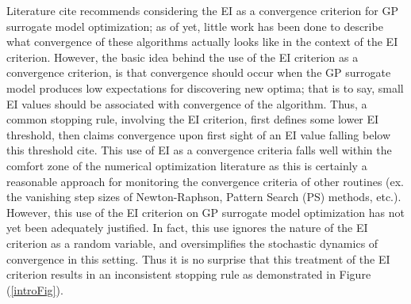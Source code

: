 \documentclass[12pt]{article}
\begin{document}
{\color{red}Literature cite} recommends considering the EI as a convergence criterion for GP surrogate model optimization; as of yet, little work has been done to describe what convergence of these algorithms actually looks like in the context of the EI criterion.
However, the basic idea behind the use of the EI criterion as a convergence criterion, is that convergence should occur when the GP surrogate model produces low expectations for discovering new optima; that is to say, small EI values should be associated with convergence of the algorithm.
Thus, a common stopping rule, involving the EI criterion, first defines some lower EI threshold, then claims convergence upon first sight of an EI value falling below this threshold {\color{red}cite}.    
This use of EI as a convergence criteria falls well within the comfort zone of the numerical optimization literature as this is certainly a reasonable approach for monitoring the convergence criteria of other routines (ex. the vanishing step sizes of Newton-Raphson, Pattern Search (PS) methods, etc.).
%
However, this use of the EI criterion on GP surrogate model optimization has not yet been adequately justified.
In fact, this use ignores the nature of the EI criterion as a random variable, and oversimplifies the stochastic dynamics of convergence in this setting.
%
Thus it is no surprise that this treatment of the EI criterion results in an inconsistent stopping rule as demonstrated in Figure (\ref{introFig}).

\end{document}
